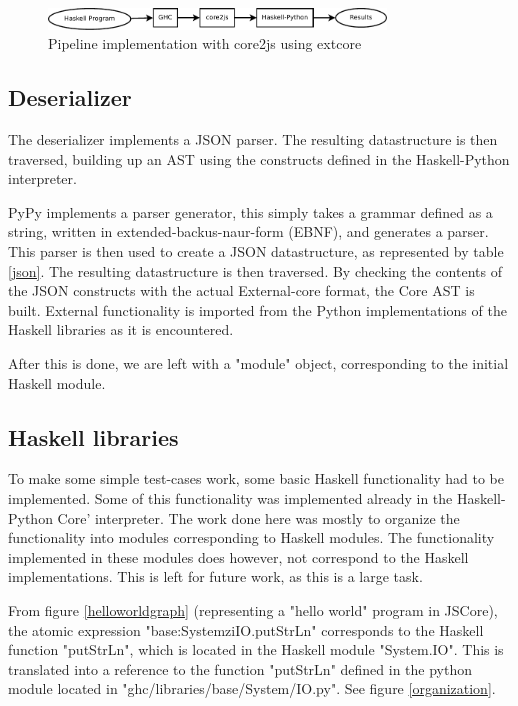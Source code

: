 \begin{figure}[H]
\begin{center}
\includegraphics[width=0.8\textwidth]{diags/pipe_w_core2js}
\caption[Pipeline with core2js]{Pipeline implementation with core2js using extcore}
\label{core2js}
\end{center}
\end{figure}

\subsection{Deserializer}

The deserializer implements a JSON parser. The resulting datastructure is then traversed, building up
an AST using the constructs defined in the Haskell-Python interpreter. 

PyPy implements a parser generator, this simply takes a grammar defined as a string, written in
extended-backus-naur-form (EBNF), and generates a parser. This parser is then used to create a 
JSON datastructure, as represented by table \ref{json}.
The resulting datastructure is then traversed. By checking the contents of the JSON constructs
with the actual External-core format, the Core AST is built. External functionality is imported
from the Python implementations of the Haskell libraries as it is encountered. 

After this is done, we are left with a "module" object, corresponding to the initial Haskell
module. 

\subsection{Haskell libraries}

To make some simple test-cases work, some basic Haskell functionality had to be 
implemented. Some of this functionality was implemented already in the 
Haskell-Python Core' interpreter.
The work done here was mostly to organize the functionality into modules corresponding
to Haskell modules. The functionality implemented in these modules does however, 
not correspond to the Haskell implementations. This is left for future work, as this 
is a large task.

From figure \ref{helloworldgraph} (representing a "hello world" program in JSCore), 
the atomic 
expression "base:SystemziIO.putStrLn" corresponds
to the Haskell function "putStrLn", which is located in the Haskell module "System.IO". This is translated
into a reference to the function "putStrLn" defined in the python module located in 
"ghc/libraries/base/System/IO.py". See figure \ref{organization}.

